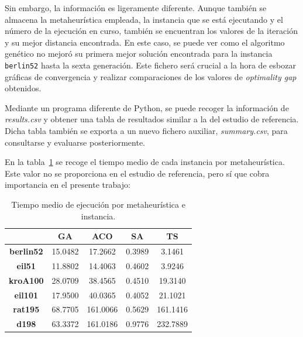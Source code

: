 Sin embargo, la información es ligeramente diferente. Aunque también se almacena la metaheurística empleada, la instancia que
se está ejecutando y el número de la ejecución en curso, también se encuentran los valores de la iteración y su mejor distancia
encontrada. En este caso, se puede ver como el algoritmo genético no mejoró su primera mejor solución encontrada para la instancia
\texttt{berlin52} hasta la sexta generación. Este fichero será crucial a la hora de esbozar gráficas de convergencia y 
realizar comparaciones de los valores de \textit{optimality gap} obtenidos.

Mediante un programa diferente de Python, se puede recoger la información de \textit{results.csv} y obtener una tabla de
resultados similar a la del estudio de referencia. Dicha tabla también se exporta a un nuevo fichero auxiliar, 
\textit{summary.csv}, para consultarse y evaluarse posteriormente.

En la tabla~\ref{tab:time} se recoge el tiempo medio de cada instancia por metaheurística. Este valor no se proporciona en el estudio
de referencia, pero sí que cobra importancia en el presente trabajo:

\begin{table}[ht]
    \renewcommand{\arraystretch}{1.3}
    \caption{Tiempo medio de ejecución por metaheurística e instancia.}
    \label{tab:time}
    \begin{center}
        \begin{tabular}{|c|c|c|c|c|}
            \hline
            & \textbf{GA} & \textbf{ACO} & \textbf{SA} & \textbf{TS} \\
            \hline
            \textbf{berlin52} & 15.0482 & 17.2662 & 0.3989 & 3.1461 \\
            \hline
            \textbf{eil51} & 11.8802 & 14.4063 & 0.4602 & 3.9246 \\
            \hline
            \textbf{kroA100} & 28.0709 & 38.4565 & 0.4510 & 19.3140 \\
            \hline
            \textbf{eil101} & 17.9500 & 40.0365 & 0.4052 & 21.1021 \\
            \hline
            \textbf{rat195} & 68.7705 & 161.0066 & 0.5629 & 161.1416 \\
            \hline
            \textbf{d198} & 63.3372 & 161.0186 & 0.9776 & 232.7889 \\
            \hline
        \end{tabular}
    \end{center}
\end{table}

